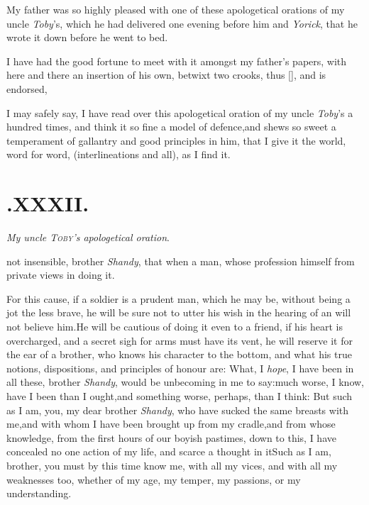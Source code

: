 \documentclass{article}
\begin{document}
My father was so highly pleased with one of these apologetical
orations of my uncle \textit{Toby}’s, which he had delivered
one evening before him and \textit{Yorick}, that he wrote it down
before he went to bed.

I have had the good fortune to meet with it amongst my
father’s papers, with here and there an insertion of his own,
betwixt two crooks, thus [\quad \quad ], and is
endorsed,

\noindent
{}

\noindent
I may safely say, I have read over this apologetical oration of
my uncle \textit{Toby}’s a hundred times, and think it so fine
a model of defence,\tsk and shews so sweet a temperament of
gallantry and good principles in him, that I give it the world,
word for word, (interlineations and all), as I find it.

\section{.\enspace XXXII.}

\smallskip
\centerline{\textit{My  uncle {\normalshape \textsc{Toby}}’s apologetical  oration}.}

\vskip -9pt\etp

 not insensible, brother \textit{Shandy}, that when a man, whose
profession 
himself from private views in doing it.

For this cause, if a soldier is a prudent man, which he may be,
without being a jot the less brave, he will be sure not to utter
his wish in the hearing of an 
will not believe him.\tsh He will be cautious of doing it
even to a friend,\tsk
{}
if his heart is overcharged, and a secret
sigh for arms must have its vent, he will reserve it for the ear of
a brother, who knows his character to the bottom, and what his true
notions, dispositions, and principles of honour are: What, I \textit{hope}, I
have been in all these, brother \textit{Shandy}, would be unbecoming
in me to say:\tsh much worse, I know, have I been than I
ought,\tsk and something worse, perhaps, than I think: But such
as I am, you, my dear brother \textit{Shandy}, who have sucked the
same breasts with me,\tsk and with whom I have been
brought up from my cradle,\tsk and from whose knowledge, from the first hours of our
boyish pastimes, down to this, I have concealed no one action of my life, and scarce
a thought in it\tsh Such as I am, brother, you must by this time know me, with all
my vices, and with all my weaknesses too, whether of my age, my temper, my passions,
or my understanding.
\end{document}
